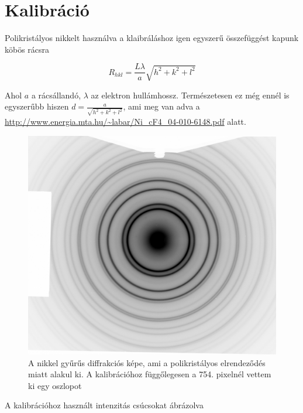 \documentclass[a4paper,12pt]{article}
\begin{document}
\section{Kalibráció}

\vspace{5mm}

\par Polikristályos nikkelt használva a klaibráláshoz igen egyszerű összefüggést kapunk köbös rácsra

\vspace{5mm}

\begin{equation}
R_{hkl} = \frac{L\lambda}{a}\sqrt{h^{2} + k^{2} + l^{2}}
\end{equation}

\vspace{5mm}

\par Ahol $a$ a rácsállandó, $\lambda$ az elektron hullámhossz. Természetesen ez még ennél is egyszerűbb hiszen $d = \frac{a}{\sqrt{h^{2} + k^{2} + l^{2}}}$, ami meg van adva a \url{http://www.energia.mta.hu/~labar/Ni_cF4_04-010-6148.pdf} alatt.

\vspace{5mm}

\begin{figure}[!htb]
\centering
\includegraphics[width=0.55\linewidth]{./Ni-Calibration.jpg}
\caption{ A nikkel gyűrűs diffrakciós képe, ami a polikristályos elrendeződés miatt alakul ki. A kalibrációhoz függőlegesen a 754. pixelnél vettem ki egy oszlopot}
\end{figure}

\vspace{5mm}

\par A kalibrációhoz használt intenzitás csúcsokat ábrázolva

\vspace{5mm}
\end{document}
